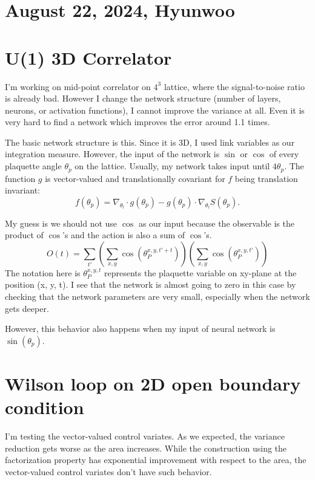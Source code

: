 \begin{center}
\section*{\creationmonth}
\end{center}

\def\day{\textit{\monthdayyeardate\today}}
\def\weekday{\textit{Thursday}}
\section*{August 22, 2024, Hyunwoo}


\section*{U(1) 3D Correlator}

I'm working on mid-point correlator on $4^3$ lattice, where the signal-to-noise ratio is already bad. However I change the network structure (number of layers, neurons, or activation functions), I cannot improve the variance at all. Even it is very hard to find a network which improves the error around 1.1 times.

The basic network structure is this. Since it is 3D, I used link variables as our integration measure. However, the input of the network is $\sin$ or $\cos$ of every plaquette angle $\theta_p$ on the lattice. Usually, my network takes input until $4\theta_p$. The function $g$ is vector-valued and translationally covariant for $f$ being translation invariant: 
\begin{equation}
    f(\theta_p) = \nabla_{\theta_l} \cdot g(\theta_p) - g(\theta_p) \cdot \nabla_{\theta_l} S(\theta_p). 
\end{equation}

My guess is we should not use $\cos$ as our input because the observable is the product of $\cos$'s and the action is also a sum of $\cos$'s.
\begin{equation}
    O(t) = \sum_{t'} \left( \sum_{x,y} \cos\left(\theta^{x,y,t'+t}_P\right)  \right)  \left( \sum_{x,y} \cos\left(\theta^{x,y,t'}_P \right)  \right)
\end{equation}
The notation here is $\theta_P^{x,y,t}$ represents the plaquette variable on xy-plane at the position (x, y, t). I see that the network is almost going to zero in this case by checking that the network parameters are very small, especially when the network gets deeper.

However, this behavior also happens when my input of neural network is $\sin(\theta_p)$.

\section*{Wilson loop on 2D open boundary condition} 

I'm testing the vector-valued control variates. As we expected, the variance reduction gets worse as the area increases. While the construction using the factorization property has exponential improvement with respect to the area, the vector-valued control variates don't have such behavior.